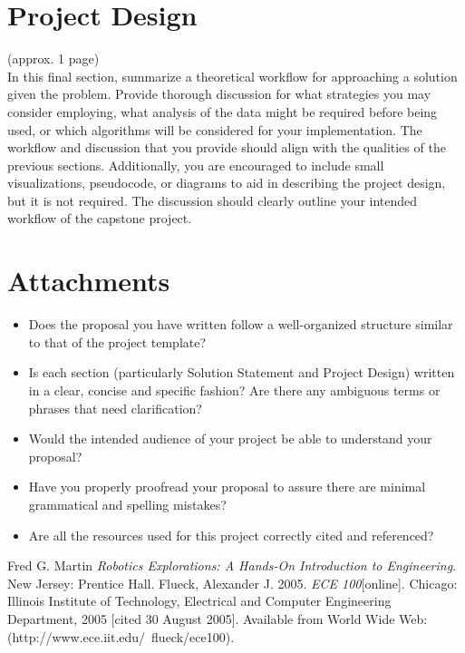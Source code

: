 \documentclass[a4paper, 11pt]{article}
\begin{document}
\section*{Project Design}
(approx. 1 page) \\
In this final section, summarize a theoretical workflow for approaching a solution given the problem. 
Provide thorough discussion for what strategies you may consider employing, what analysis of the data might be required before being used, or which algorithms will be considered for your implementation.
The workflow and discussion that you provide should align with the qualities of the previous sections. 
Additionally, you are encouraged to include small visualizations, pseudocode, or diagrams to aid in describing the project design, but it is not required.
The discussion should clearly outline your intended workflow of the capstone project.



\section*{Attachments}
   \begin{itemize}
       \item Does the proposal you have written follow a well-organized structure similar to that of the project template?
       \item Is each section (particularly Solution Statement and Project Design) written in a clear, concise and specific fashion? Are there any ambiguous terms or phrases that need clarification?
       \item Would the intended audience of your project be able to understand your proposal?
       \item Have you properly proofread your proposal to assure there are minimal grammatical and spelling mistakes?
       \item Are all the resources used for this project correctly cited and referenced?
   \end{itemize} 

\begin{thebibliography}{9}
 Fred G. Martin \emph{Robotics Explorations: A Hands-On Introduction to Engineering}. New Jersey: Prentice Hall.
  Flueck, Alexander J. 2005. \emph{ECE 100}[online]. Chicago: Illinois Institute of Technology, Electrical and Computer Engineering Department, 2005 [cited 30
August 2005]. Available from World Wide Web: (http://www.ece.iit.edu/~flueck/ece100).
\end{thebibliography}
\end{document}
